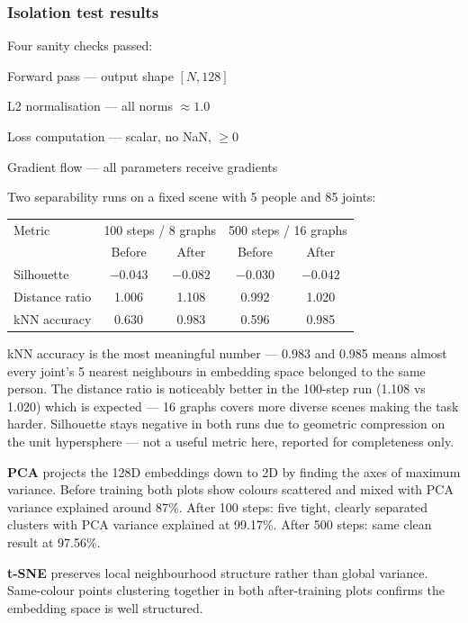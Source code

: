 \subsubsection{Isolation test results}

Four sanity checks passed:
\begin{compactitem}
  \item Forward pass --- output shape $[N, 128]$
  \item L2 normalisation --- all norms $\approx 1.0$
  \item Loss computation --- scalar, no NaN, $\geq 0$
  \item Gradient flow --- all parameters receive gradients
\end{compactitem}

Two separability runs on a fixed scene with 5 people and 85 joints:

\begin{center}
\begin{tabular}{lcccc}
\toprule
Metric & \multicolumn{2}{c}{100 steps / 8 graphs} & \multicolumn{2}{c}{500 steps / 16 graphs} \\
 & Before & After & Before & After \\
\midrule
Silhouette & $-0.043$ & $-0.082$ & $-0.030$ & $-0.042$ \\
Distance ratio & 1.006 & 1.108 & 0.992 & 1.020 \\
kNN accuracy & 0.630 & 0.983 & 0.596 & 0.985 \\
\bottomrule
\end{tabular}
\end{center}

kNN accuracy is the most meaningful number --- 0.983 and 0.985 means almost every joint's 5 nearest neighbours in embedding space belonged to the same person. The distance ratio is noticeably better in the 100-step run (1.108 vs 1.020) which is expected --- 16 graphs covers more diverse scenes making the task harder. Silhouette stays negative in both runs due to geometric compression on the unit hypersphere --- not a useful metric here, reported for completeness only.

\textbf{PCA} projects the 128D embeddings down to 2D by finding the axes of maximum variance. Before training both plots show colours scattered and mixed with PCA variance explained around 87\%. After 100 steps: five tight, clearly separated clusters with PCA variance explained at 99.17\%. After 500 steps: same clean result at 97.56\%.

\textbf{t-SNE} preserves local neighbourhood structure rather than global variance. Same-colour points clustering together in both after-training plots confirms the embedding space is well structured.

